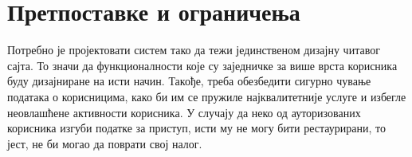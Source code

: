 \section{Претпоставке и ограничења}
Потребно је пројектовати систем тако да тежи јединственом дизајну читавог сајта. То значи да функционалности које су заједничке за више врста корисника буду дизајниране на исти начин. Такође, треба обезбедити сигурно чување података о корисницима, како би им се пружиле најквалитетније услуге и избегле неовлашћене активности корисника. У случају да неко од ауторизованих корисника изгуби податке за приступ, исти му не могу бити рестаурирани, то јест, не би могао да поврати свој налог.